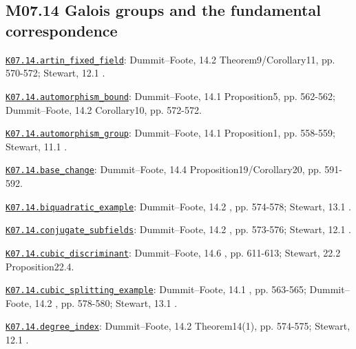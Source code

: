 \subsection*{M07.14 Galois groups and the fundamental correspondence}
\par\smallskip\noindent\hypertarget{src:K07.14.artin_fixed_field}{}\label{src:K07.14.artin_fixed_field}\hyperref[K07.14.artin_fixed_field]{\texttt{K07.14.artin\_fixed\_field}}: Dummit--Foote, 14.2 Theorem9/Corollary11, pp. 570-572; Stewart, 12.1 .
\par\smallskip\noindent\hypertarget{src:K07.14.automorphism_bound}{}\label{src:K07.14.automorphism_bound}\hyperref[K07.14.automorphism_bound]{\texttt{K07.14.automorphism\_bound}}: Dummit--Foote, 14.1 Proposition5, pp. 562-562; Dummit--Foote, 14.2 Corollary10, pp. 572-572.
\par\smallskip\noindent\hypertarget{src:K07.14.automorphism_group}{}\label{src:K07.14.automorphism_group}\hyperref[K07.14.automorphism_group]{\texttt{K07.14.automorphism\_group}}: Dummit--Foote, 14.1 Proposition1, pp. 558-559; Stewart, 11.1 .
\par\smallskip\noindent\hypertarget{src:K07.14.base_change}{}\label{src:K07.14.base_change}\hyperref[K07.14.base_change]{\texttt{K07.14.base\_change}}: Dummit--Foote, 14.4 Proposition19/Corollary20, pp. 591-592.
\par\smallskip\noindent\hypertarget{src:K07.14.biquadratic_example}{}\label{src:K07.14.biquadratic_example}\hyperref[K07.14.biquadratic_example]{\texttt{K07.14.biquadratic\_example}}: Dummit--Foote, 14.2 , pp. 574-578; Stewart, 13.1 .
\par\smallskip\noindent\hypertarget{src:K07.14.conjugate_subfields}{}\label{src:K07.14.conjugate_subfields}\hyperref[K07.14.conjugate_subfields]{\texttt{K07.14.conjugate\_subfields}}: Dummit--Foote, 14.2 , pp. 573-576; Stewart, 12.1 .
\par\smallskip\noindent\hypertarget{src:K07.14.cubic_discriminant}{}\label{src:K07.14.cubic_discriminant}\hyperref[K07.14.cubic_discriminant]{\texttt{K07.14.cubic\_discriminant}}: Dummit--Foote, 14.6 , pp. 611-613; Stewart, 22.2 Proposition22.4.
\par\smallskip\noindent\hypertarget{src:K07.14.cubic_splitting_example}{}\label{src:K07.14.cubic_splitting_example}\hyperref[K07.14.cubic_splitting_example]{\texttt{K07.14.cubic\_splitting\_example}}: Dummit--Foote, 14.1 , pp. 563-565; Dummit--Foote, 14.2 , pp. 578-580; Stewart, 13.1 .
\par\smallskip\noindent\hypertarget{src:K07.14.degree_index}{}\label{src:K07.14.degree_index}\hyperref[K07.14.degree_index]{\texttt{K07.14.degree\_index}}: Dummit--Foote, 14.2 Theorem14(1), pp. 574-575; Stewart, 12.1 .
